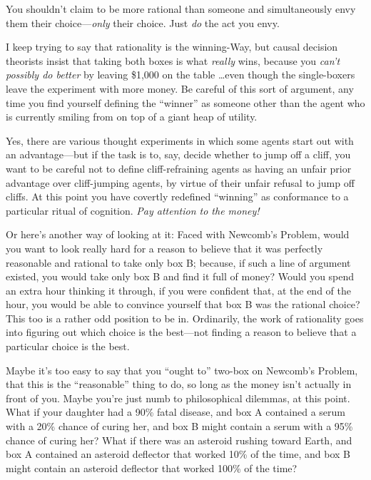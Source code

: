 {
 You shouldn't claim to be more rational than
someone and simultaneously envy them their choice---\textit{only} their
choice. Just \textit{do} the act you envy.}

{
 I keep trying to say that rationality is the winning-Way, but
causal decision theorists insist that taking both boxes is what
\textit{really} wins, because you \textit{can't
possibly do better} by leaving \$1,000 on the table \ldots even though
the single-boxers leave the experiment with more money. Be careful of
this sort of argument, any time you find yourself defining the
``winner'' as someone other than the
agent who is currently smiling from on top of a giant heap of utility.}

{
 Yes, there are various thought experiments in which some agents
start out with an advantage---but if the task is to, say, decide
whether to jump off a cliff, you want to be careful not to define
cliff-refraining agents as having an unfair prior advantage over
cliff-jumping agents, by virtue of their unfair refusal to jump off
cliffs. At this point you have covertly redefined
``winning'' as conformance to a
particular ritual of cognition. \textit{Pay attention to the money!}}

{
 Or here's another way of looking at it: Faced with
Newcomb's Problem, would you want to look really hard
for a reason to believe that it was perfectly reasonable and rational
to take only box B; because, if such a line of argument existed, you
would take only box B and find it full of money? Would you spend an
extra hour thinking it through, if you were confident that, at the end
of the hour, you would be able to convince yourself that box B was the
rational choice? This too is a rather odd position to be in.
Ordinarily, the work of rationality goes into figuring out which choice
is the best---not finding a reason to believe that a particular choice
is the best.}

{
 Maybe it's too easy to say that you
``ought to'' two-box on
Newcomb's Problem, that this is the
``reasonable'' thing to do, so long
as the money isn't actually in front of you. Maybe
you're just numb to philosophical dilemmas, at this
point. What if your daughter had a 90\% fatal disease, and box A
contained a serum with a 20\% chance of curing her, and box B might
contain a serum with a 95\% chance of curing her? What if there was an
asteroid rushing toward Earth, and box A contained an asteroid
deflector that worked 10\% of the time, and box B might contain an
asteroid deflector that worked 100\% of the time?}

